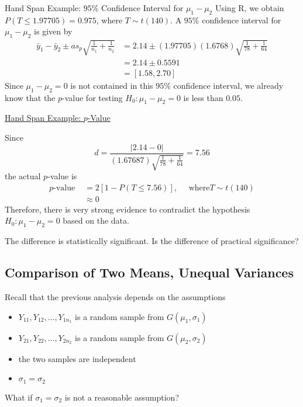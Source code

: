 \begin{Example}{Hand Span Example: $ 95\% $ Confidence Interval for $ \mu_1-\mu_2 $}{}
    Using R, we obtain $ P(T\leqslant 1.97705)=0.975 $, where $ T\sim t(140) $.
    A $ 95\% $ confidence interval for $ \mu_1-\mu_2 $ is given by
    \[\begin{aligned}
            \bar{y}_{1}-\bar{y}_{2} \pm a s_{p} \sqrt{\frac{1}{n_{1}}+\frac{1}{n_{2}}} & =2.14 \pm(1.97705)(1.6768) \sqrt{\frac{1}{78}+\frac{1}{64}} \\
                                                                                       & =2.14 \pm 0.5591                                            \\
                                                                                       & =[1.58,2.70]
        \end{aligned}\]
    Since $ \mu_1-\mu_2=0 $ is not contained in this $ 95\% $ confidence interval, we already
    know that the $ p $-value for testing $ H_0:\mu_1-\mu_2=0 $ is less than $ 0.05 $.

    \underline{Hand Span Example: $ p $-Value}

    Since
    \[d=\frac{|2.14-0|}{(1.67687) \sqrt{\frac{1}{78}+\frac{1}{64}}}=7.56\]
    the actual $ p $-value is
    \[\begin{aligned}
            p \text{-value } & =2[1-P(T \leq 7.56)], \quad \text{ where} T \sim t(140) \\
                             & \approx 0
        \end{aligned}\]
    Therefore, there is very strong evidence to contradict the hypothesis $ H_0:\mu_1-\mu_2=0 $
    based on the data.

    The difference is statistically significant. Is the difference of practical significance?
\end{Example}


\subsection{Comparison of Two Means, Unequal Variances}
Recall that the previous analysis depends on the assumptions
\begin{itemize}
    \item $ Y_{11},Y_{12},\ldots ,Y_{1n_1} $ is a random sample from $ G(\mu_1,\sigma_1) $
    \item $ Y_{21},Y_{22},\ldots ,Y_{2n_2} $ is a random sample from $ G(\mu_2,\sigma_2) $
    \item the two samples are independent
    \item $ \sigma_1=\sigma_2 $
\end{itemize}
What if $ \sigma_1=\sigma_2 $ is not a reasonable assumption?

